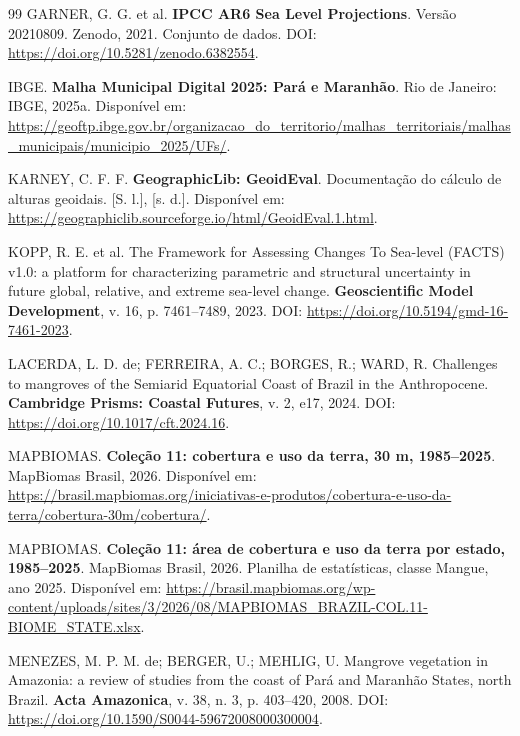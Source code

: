 \documentclass[12pt,a4paper]{article}
\begin{document}
\begin{thebibliography}{99}
GARNER, G. G. et al. \textbf{IPCC AR6 Sea Level Projections}. Versão 20210809. Zenodo, 2021. Conjunto de dados. DOI: \url{https://doi.org/10.5281/zenodo.6382554}.

IBGE. \textbf{Malha Municipal Digital 2025: Pará e Maranhão}. Rio de Janeiro: IBGE, 2025a. Disponível em: \url{https://geoftp.ibge.gov.br/organizacao_do_territorio/malhas_territoriais/malhas_municipais/municipio_2025/UFs/}.

KARNEY, C. F. F. \textbf{GeographicLib: GeoidEval}. Documentação do cálculo de alturas geoidais. [S. l.], [s. d.]. Disponível em: \url{https://geographiclib.sourceforge.io/html/GeoidEval.1.html}.

KOPP, R. E. et al. The Framework for Assessing Changes To Sea-level (FACTS) v1.0: a platform for characterizing parametric and structural uncertainty in future global, relative, and extreme sea-level change. \textbf{Geoscientific Model Development}, v. 16, p. 7461--7489, 2023. DOI: \url{https://doi.org/10.5194/gmd-16-7461-2023}.

LACERDA, L. D. de; FERREIRA, A. C.; BORGES, R.; WARD, R. Challenges to mangroves of the Semiarid Equatorial Coast of Brazil in the Anthropocene. \textbf{Cambridge Prisms: Coastal Futures}, v. 2, e17, 2024. DOI: \url{https://doi.org/10.1017/cft.2024.16}.

MAPBIOMAS. \textbf{Coleção 11: cobertura e uso da terra, 30 m, 1985--2025}. MapBiomas Brasil, 2026. Disponível em: \url{https://brasil.mapbiomas.org/iniciativas-e-produtos/cobertura-e-uso-da-terra/cobertura-30m/cobertura/}.

MAPBIOMAS. \textbf{Coleção 11: área de cobertura e uso da terra por estado, 1985--2025}. MapBiomas Brasil, 2026. Planilha de estatísticas, classe Mangue, ano 2025. Disponível em: \url{https://brasil.mapbiomas.org/wp-content/uploads/sites/3/2026/08/MAPBIOMAS_BRAZIL-COL.11-BIOME_STATE.xlsx}.

MENEZES, M. P. M. de; BERGER, U.; MEHLIG, U. Mangrove vegetation in Amazonia: a review of studies from the coast of Pará and Maranhão States, north Brazil. \textbf{Acta Amazonica}, v. 38, n. 3, p. 403--420, 2008. DOI: \url{https://doi.org/10.1590/S0044-59672008000300004}.


\end{thebibliography}
\end{document}
